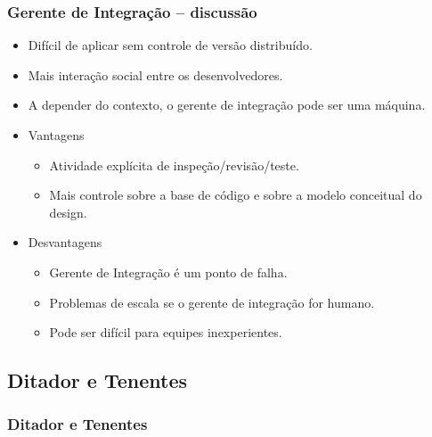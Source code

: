 \documentclass{beamer}
\begin{document}
\begin{frame}
  \frametitle{Gerente de Integração -- discussão}
  \begin{itemize}
    \item Difícil de aplicar sem controle de versão distribuído.
    \item Mais interação social entre os desenvolvedores.
    \item A depender do contexto, o gerente de integração pode ser uma
      máquina.
    \item Vantagens
      \begin{itemize}
        \item<2-> Atividade explícita de inspeção/revisão/teste.
        \item<3-> Mais controle sobre a base de código e sobre a modelo
          conceitual do design.
      \end{itemize}
    \item Desvantagens
      \begin{itemize}
        \item<4-> Gerente de Integração é um ponto de falha.
        \item<5-> Problemas de escala se o gerente de integração for
          humano.
        \item<6-> Pode ser difícil para equipes inexperientes.
      \end{itemize}
  \end{itemize}
\end{frame}

\subsection{Ditador e Tenentes}

\begin{frame}
  \frametitle{Ditador e Tenentes}
  \begin{figure}[h]
    \begin{center}
    \end{center}
    \label{fig:dictator-and-lieutenants}
  \end{figure}
\end{frame}
\end{document}
